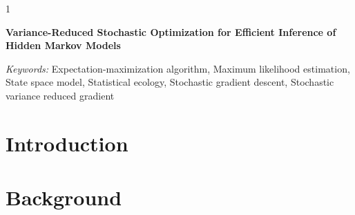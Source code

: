 \documentclass[12pt]{article}
\newcommand{\blind}{1}
\begin{document}
\blind
{
  \bigskip
  \bigskip
  \bigskip
  \begin{center}
    {\LARGE\bf Variance-Reduced Stochastic Optimization for Efficient Inference of Hidden Markov Models}
  \end{center}
  \medskip
} \fi

\bigskip
\begin{abstract}
    Hidden Markov models (HMMs) are popular models to identify a finite number of discrete latent states from sequential data. However, fitting them to large data sets can be computationally demanding as it usually requires iterating through the entire underlying data set for every parameter update. Specifically, numerical optimization methods require a full pass of the data to evaluate the gradient of the likelihood, and the expectation-maximization (EM) algorithm requires a full data pass to perform its E step before each parameter update. The EM algorithm also often requires numerical optimization to perform its M step. We propose an optimization algorithm that updates the parameters of an HMM without iterating through the entire data set. Namely, we combine a partial E step with variance-reduced stochastic optimization within the M step. We also prove the algorithm converges under certain regularity conditions. Using simulations and a case study of kinematic data from eight killer whales ({\em{Orcinus orca}}) off the western coast of Canada, we show that our algorithm converges in fewer epochs and to regions of higher likelihood compared to standard numerical optimization techniques. Our algorithm allows practitioners to fit complicated HMMs to large time-series data sets more efficiently than existing baselines.
\end{abstract}

\noindent%
{\it Keywords:} Expectation-maximization algorithm, Maximum likelihood estimation, State space model, Statistical ecology, Stochastic gradient descent, Stochastic variance reduced gradient
\vfill 

\newpage
{} %

\section{Introduction}


\section{Background}

\end{document}

